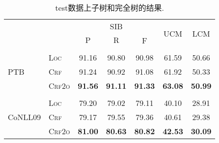 \begin{table}[tb!]
  \setlength{\tabcolsep}{5pt}
  \centering
  \caption{test数据上子树和完全树的结果.}
  \begin{tabular}{llccccc}
    \toprule
                             &                & \multicolumn{3}{c}{SIB} & \multirow{2}{*}{UCM} & \multirow{2}{*}{LCM}                                   \\
                             &                & $\mathrm{P}$            & $\mathrm{R}$         & F                                                      \\[2pt]
    \hline
    \\[-15pt]
    \multirow{3}{*}{PTB}     & \textsc{Loc}   & 91.16                   & 90.80                & 90.98                & 61.59          & 50.66          \\
                             & \textsc{Crf}   & 91.24                   & 90.92                & 91.08                & 61.92          & 50.33          \\
                             & \textsc{Crf2o} & \textbf{91.56}          & \textbf{91.11}       & \textbf{91.33}       & \textbf{63.08} & \textbf{50.99} \\[2pt]
    \hline
    \\[-15pt]
    \multirow{3}{*}{CoNLL09} & \textsc{Loc}   & 79.20                   & 79.02                & 79.11                & 40.10          & 28.91          \\
                             & \textsc{Crf}   & 79.17                   & 79.55                & 79.36                & 40.61          & 29.38          \\
                             & \textsc{Crf2o} & \textbf{81.00}          & \textbf{80.63}       & \textbf{80.82}       & \textbf{42.53} & \textbf{30.09} \\
    \bottomrule
  \end{tabular}
  \label{table:dev-test-subtree}
\end{table}